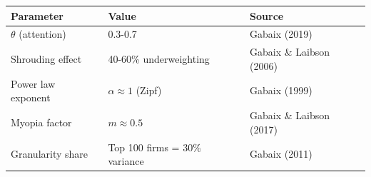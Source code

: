 \begin{tcolorbox}[colback=yellow!10!white, colframe=orange!75!black, title=Quick Reference: Key Gabaix Parameters]
\begin{tabular}{lll}
\textbf{Parameter} & \textbf{Value} & \textbf{Source} \\
\hline
$\theta$ (attention) & 0.3-0.7 & Gabaix (2019) \\
Shrouding effect & 40-60\% underweighting & Gabaix \& Laibson (2006) \\
Power law exponent & $\alpha \approx 1$ (Zipf) & Gabaix (1999) \\
Myopia factor & $m \approx 0.5$ & Gabaix \& Laibson (2017) \\
Granularity share & Top 100 firms = 30\% variance & Gabaix (2011) \\
\end{tabular}
\end{tcolorbox}


